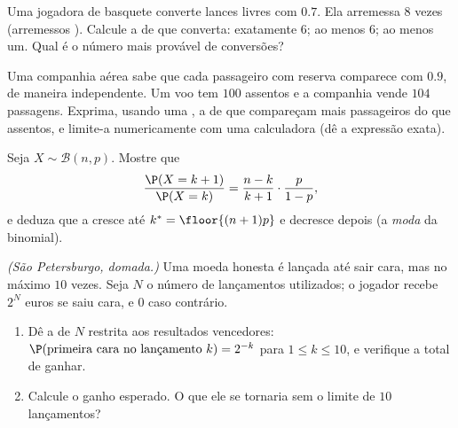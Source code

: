 \begin{exercise}[$\star\star$]\label{exo:g12:randvar:5}
Uma jogadora de basquete converte lances livres com  $0.7$.
Ela arremessa $8$ vezes (arremessos ). Calcule a
 de que converta: exatamente $6$; ao menos $6$; ao menos um.
Qual é o número mais provável de conversões?
\end{exercise}

\begin{exercise}[$\star\star$]\label{exo:g12:randvar:6}
Uma companhia aérea sabe que cada passageiro com reserva comparece com
 $0.9$, de maneira independente. Um voo tem $100$ assentos e
a companhia vende $104$ passagens. Exprima, usando uma , a  de que compareçam mais passageiros do que
assentos, e limite-a numericamente com uma calculadora (dê a expressão
exata).
\end{exercise}

\begin{exercise}[$\star\star$]\label{exo:g12:randvar:7}
Seja $X \sim \mathcal B(n, p)$. Mostre que
\[
\frac{\P(X = k+1)}{\P(X = k)} = \frac{n-k}{k+1}\cdot\frac{p}{1-p},
\]
e deduza que a  cresce até
$k^* = \floor{(n+1)p}$ e decresce depois (a \emph{moda} da binomial).
\end{exercise}

\begin{exercise}[$\star\star\star$]\label{exo:g12:randvar:8}
\emph{(São Petersburgo, domada.)} Uma moeda honesta é lançada até sair
cara, mas no máximo $10$ vezes. Seja $N$ o número de lançamentos
utilizados; o jogador recebe $2^N$ euros se saiu cara, e $0$ caso
contrário.
\begin{enumerate}
  \item Dê a  de $N$ restrita aos resultados vencedores:
        $\P(\text{primeira cara no lançamento } k) = 2^{-k}$ para
        $1 \leq k \leq 10$, e verifique a  total de ganhar.
  \item Calcule o ganho esperado. O que ele se tornaria sem o limite de
        $10$ lançamentos?
\end{enumerate}
\end{exercise}

